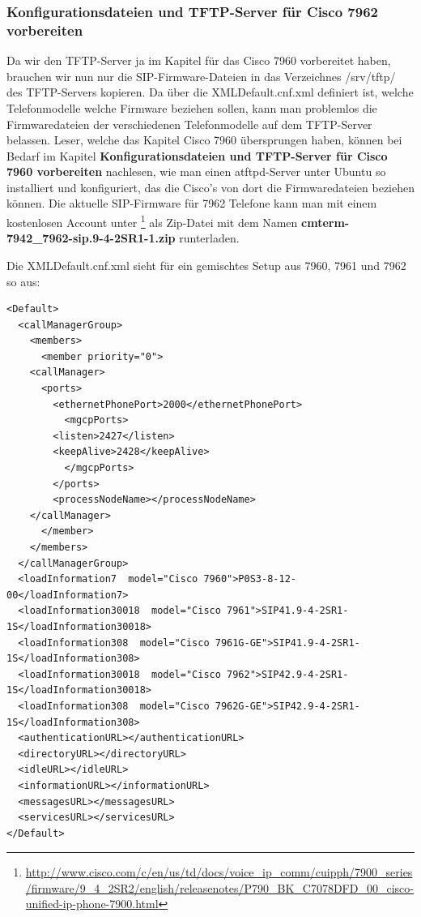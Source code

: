 \documentclass[a4paper,12pt]{scrbook}
\begin{document}
\subsubsection{Konfigurationsdateien und TFTP-Server für Cisco 7962 vorbereiten}
Da wir den TFTP-Server ja im Kapitel für das Cisco 7960 vorbereitet haben, brauchen wir nun nur die SIP-Firmware-Dateien in das Verzeichnes /srv/tftp/ des TFTP-Servers kopieren.
Da über die XMLDefault.cnf.xml definiert ist, welche Telefonmodelle welche Firmware beziehen sollen, kann man problemlos die Firmwaredateien der verschiedenen Telefonmodelle auf 
dem TFTP-Server belassen. Leser, welche das Kapitel Cisco 7960 übersprungen haben, können bei Bedarf im Kapitel \textbf{Konfigurationsdateien und TFTP-Server für Cisco 7960 vorbereiten}
nachlesen, wie man einen atftpd-Server unter Ubuntu so installiert und konfiguriert, das die Cisco's von dort die Firmwaredateien beziehen können. Die aktuelle SIP-Firmware für 7962 Telefone
kann man mit einem kostenlosen Account unter \footnote{\url{http://www.cisco.com/c/en/us/td/docs/voice\_ip\_comm/cuipph/7900\_series/firmware/9\_4\_2SR2/english/releasenotes/P790\_BK\_C7078DFD\_00\_cisco-unified-ip-phone-7900.html}} als Zip-Datei mit dem Namen \textbf{cmterm-7942\_7962-sip.9-4-2SR1-1.zip} runterladen.

Die XMLDefault.cnf.xml sieht für ein gemischtes Setup aus 7960, 7961 und 7962 so aus:
\begin{lstlisting}[caption={XMLDefault.cnf.xml für Cisco 7960, 7961 und 7962 gültig}, label=lst:xmldefaultcnfcml796079617962]    
<Default>
  <callManagerGroup>
    <members>
      <member priority="0">
	<callManager>
	  <ports>
	    <ethernetPhonePort>2000</ethernetPhonePort>
	      <mgcpPorts>
		<listen>2427</listen>
		<keepAlive>2428</keepAlive>
	      </mgcpPorts>
	    </ports>
	    <processNodeName></processNodeName>
	</callManager>
      </member>
    </members>
  </callManagerGroup>
  <loadInformation7  model="Cisco 7960">P0S3-8-12-00</loadInformation7>
  <loadInformation30018  model="Cisco 7961">SIP41.9-4-2SR1-1S</loadInformation30018>
  <loadInformation308  model="Cisco 7961G-GE">SIP41.9-4-2SR1-1S</loadInformation308>
  <loadInformation30018  model="Cisco 7962">SIP42.9-4-2SR1-1S</loadInformation30018> 
  <loadInformation308  model="Cisco 7962G-GE">SIP42.9-4-2SR1-1S</loadInformation308> 
  <authenticationURL></authenticationURL>
  <directoryURL></directoryURL>
  <idleURL></idleURL>
  <informationURL></informationURL>
  <messagesURL></messagesURL>
  <servicesURL></servicesURL>
</Default>
\end{lstlisting}
\end{document}
